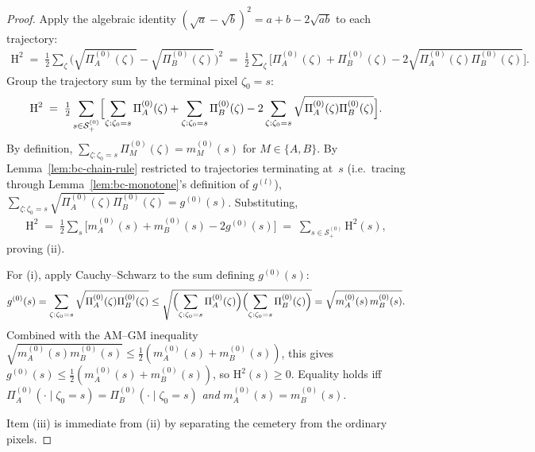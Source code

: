 \documentclass[twoside]{article}
\newcommand{\1}{\mathbf{1}}
\begin{document}
\begin{proof}
Apply the algebraic identity $(\sqrt{a} - \sqrt{b})^2 = a + b - 2\sqrt{ab}$ to each trajectory:
\begin{align}
    \mathrm{H}^2 \;=\; \tfrac{1}{2}\sum_{\zeta}\bigl(\sqrt{\Pi^{(0)}_A(\zeta)} -
    \sqrt{\Pi^{(0)}_B(\zeta)}\bigr)^2
    \;=\; \tfrac{1}{2}\sum_{\zeta}\bigl[\Pi^{(0)}_A(\zeta) + \Pi^{(0)}_B(\zeta) -
    2\sqrt{\Pi^{(0)}_A(\zeta)\Pi^{(0)}_B(\zeta)}\bigr].
\end{align}
Group the trajectory sum by the terminal pixel $\zeta_0 = s$:
\begin{align}
    \mathrm{H}^2 \;=\; \tfrac{1}{2}\sum_{s \in \mathcal{S}^{(0)}_+}\Bigl[\sum_{\zeta: \zeta_0 =
    s}\Pi^{(0)}_A(\zeta)
    + \sum_{\zeta: \zeta_0 = s}\Pi^{(0)}_B(\zeta)
    - 2\sum_{\zeta: \zeta_0 = s}\sqrt{\Pi^{(0)}_A(\zeta)\Pi^{(0)}_B(\zeta)}\Bigr].
\end{align}
By definition, $\sum_{\zeta: \zeta_0 = s}\Pi^{(0)}_M(\zeta) = m^{(0)}_M(s)$ for $M \in \{A,B\}$.
By Lemma~\ref{lem:bc-chain-rule} restricted to trajectories terminating at~$s$ (i.e.\ tracing
through Lemma~\ref{lem:bc-monotone}'s definition of $g^{(l)}$), $\sum_{\zeta: \zeta_0 =
    s}\sqrt{\Pi^{(0)}_A(\zeta)\Pi^{(0)}_B(\zeta)} = g^{(0)}(s)$.  Substituting,
\begin{align}
    \mathrm{H}^2 \;=\; \tfrac{1}{2}\sum_s\bigl[m^{(0)}_A(s) + m^{(0)}_B(s) - 2g^{(0)}(s)\bigr]
    \;=\; \sum_{s \in \mathcal{S}^{(0)}_+} \mathrm{H}^2(s),
\end{align}
proving (ii).

For (i), apply Cauchy--Schwarz to the sum defining $g^{(0)}(s)$:
\begin{align}
    g^{(0)}(s)
    = \sum_{\zeta: \zeta_0 = s} \sqrt{\Pi^{(0)}_A(\zeta) \Pi^{(0)}_B(\zeta)}
    \leq \sqrt{\Bigl(\sum_{\zeta: \zeta_0 = s}\Pi^{(0)}_A(\zeta)\Bigr)\Bigl(\sum_{\zeta: \zeta_0 =
    s}\Pi^{(0)}_B(\zeta)\Bigr)}
    = \sqrt{m^{(0)}_A(s)\,m^{(0)}_B(s)}.
\end{align}
Combined with the AM--GM inequality $\sqrt{m^{(0)}_A(s)m^{(0)}_B(s)} \leq \tfrac{1}{2}(m^{(0)}_A(s)
    + m^{(0)}_B(s))$, this gives $g^{(0)}(s) \leq \tfrac{1}{2}(m^{(0)}_A(s) + m^{(0)}_B(s))$, so
$\mathrm{H}^2(s) \geq 0$.  Equality holds iff $\Pi^{(0)}_A(\cdot \mid \zeta_0 = s) =
    \Pi^{(0)}_B(\cdot \mid \zeta_0 = s)$ \emph{and} $m^{(0)}_A(s) = m^{(0)}_B(s)$.

Item (iii) is immediate from (ii) by separating the cemetery from the ordinary pixels.
\end{proof}
\end{document}

